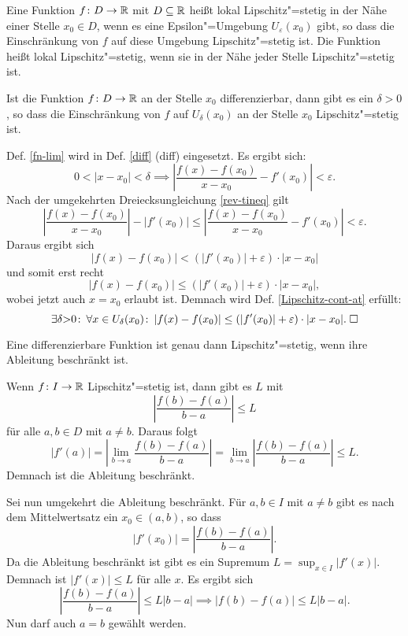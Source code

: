 \begin{Definition}\newlinefirst
Eine Funktion $f\colon D\to\mathbb R$ mit $D\subseteq\mathbb R$ heißt lokal
Lipschitz"=stetig in der Nähe einer Stelle $x_0\in D$, wenn es eine
Epsilon"=Umgebung $U_\varepsilon(x_0)$ gibt, so dass die Einschränkung
von $f$ auf diese Umgebung Lipschitz"=stetig ist. Die Funktion heißt
lokal Lipschitz"=stetig, wenn sie in der Nähe jeder Stelle
Lipschitz"=stetig ist.
\end{Definition}

\begin{Satz}\label{diff-nh-Lipschitz-cont-at}
Ist die Funktion $f\colon D\to\mathbb R$ an der Stelle $x_0$ differenzierbar,
dann gibt es ein $\delta>0$, so dass die Einschränkung von $f$
auf $U_\delta(x_0)$ an der Stelle $x_0$ Lipschitz"=stetig ist.
\end{Satz}

\begin{Beweis}
Def. \ref{fn-lim} wird in Def. \ref{diff} (diff) eingesetzt.
Es ergibt sich:
\[0<|x-x_0|<\delta\implies
\left|\frac{f(x)-f(x_0)}{x-x_0}-f'(x_0)\right|<\varepsilon.\]
Nach der umgekehrten Dreiecksungleichung \ref{rev-tineq} gilt
\[\left|\frac{f(x)-f(x_0)}{x-x_0}\right|-|f'(x_0)| \le
\left|\frac{f(x)-f(x_0)}{x-x_0}-f'(x_0)\right|
< \varepsilon.\]
Daraus ergibt sich
\[|f(x)-f(x_0)| < (|f'(x_0)|+\varepsilon)\cdot |x-x_0|\]
und somit erst recht
\[|f(x)-f(x_0)| \le (|f'(x_0)|+\varepsilon)\cdot |x-x_0|,\]
wobei jetzt auch $x=x_0$ erlaubt ist. Demnach wird Def.
\ref{Lipschitz-cont-at} erfüllt:
\[\exists \delta{>}0\colon\,\forall x\in U_\delta(x_0)\colon\,
|f(x)-f(x_0)| \le (|f'(x_0)|+\varepsilon)\cdot |x-x_0|.\;\square\]
\end{Beweis}

\begin{Satz}\label{diff-bounded-Lipschitz-cont}
Eine differenzierbare Funktion ist genau dann Lipschitz"=stetig,
wenn ihre Ableitung beschränkt ist.
\end{Satz}
\begin{Beweis}
Wenn $f\colon I\to\mathbb R$ Lipschitz"=stetig ist, dann gibt es $L$ mit
\[\left|\frac{f(b)-f(a)}{b-a}\right|\le L\]
für alle $a,b\in D$ mit $a\ne b$. Daraus folgt
\[|f'(a)| = \left|\lim_{b\to a} \frac{f(b)-f(a)}{b-a}\right|
= \lim_{b\to a} \left|\frac{f(b)-f(a)}{b-a}\right|
\le L.\]
Demnach ist die Ableitung beschränkt.

Sei nun umgekehrt die Ableitung beschränkt. Für $a,b\in I$ mit $a\ne b$
gibt es nach dem Mittelwertsatz ein $x_0\in(a,b)$, so dass
\[|f'(x_0)| = \left|\frac{f(b)-f(a)}{b-a}\right|.\]
Da die Ableitung beschränkt ist gibt es ein Supremum
$L = \sup_{x\in I} |f'(x)|$. Demnach ist $|f'(x)|\le L$ für alle $x$.
Es ergibt sich
\[\left|\frac{f(b)-f(a)}{b-a}\right|\le L|b-a| \implies |f(b)-f(a)|\le L|b-a|.\]
Nun darf auch $a=b$ gewählt werden.\;\qedsymbol
\end{Beweis}

